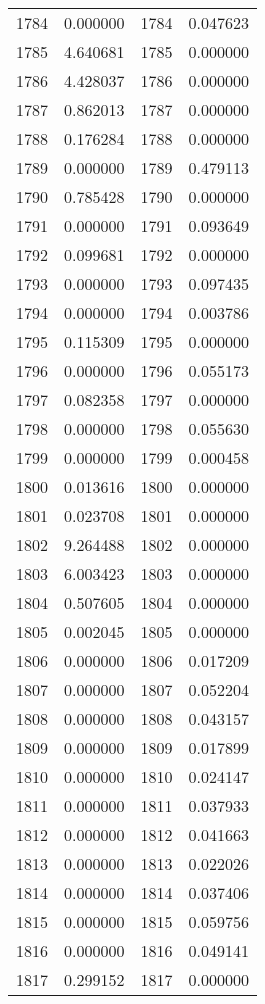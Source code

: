 \documentclass[12pt]{article}
\begin{document}
\begin{longtable}{@{}cccc@{}}
1784 & 0.000000 & 1784 & 0.047623 \\
1785 & 4.640681 & 1785 & 0.000000 \\
1786 & 4.428037 & 1786 & 0.000000 \\
1787 & 0.862013 & 1787 & 0.000000 \\
1788 & 0.176284 & 1788 & 0.000000 \\
1789 & 0.000000 & 1789 & 0.479113 \\
1790 & 0.785428 & 1790 & 0.000000 \\
1791 & 0.000000 & 1791 & 0.093649 \\
1792 & 0.099681 & 1792 & 0.000000 \\
1793 & 0.000000 & 1793 & 0.097435 \\
1794 & 0.000000 & 1794 & 0.003786 \\
1795 & 0.115309 & 1795 & 0.000000 \\
1796 & 0.000000 & 1796 & 0.055173 \\
1797 & 0.082358 & 1797 & 0.000000 \\
1798 & 0.000000 & 1798 & 0.055630 \\
1799 & 0.000000 & 1799 & 0.000458 \\
1800 & 0.013616 & 1800 & 0.000000 \\
1801 & 0.023708 & 1801 & 0.000000 \\
1802 & 9.264488 & 1802 & 0.000000 \\
1803 & 6.003423 & 1803 & 0.000000 \\
1804 & 0.507605 & 1804 & 0.000000 \\
1805 & 0.002045 & 1805 & 0.000000 \\
1806 & 0.000000 & 1806 & 0.017209 \\
1807 & 0.000000 & 1807 & 0.052204 \\
1808 & 0.000000 & 1808 & 0.043157 \\
1809 & 0.000000 & 1809 & 0.017899 \\
1810 & 0.000000 & 1810 & 0.024147 \\
1811 & 0.000000 & 1811 & 0.037933 \\
1812 & 0.000000 & 1812 & 0.041663 \\
1813 & 0.000000 & 1813 & 0.022026 \\
1814 & 0.000000 & 1814 & 0.037406 \\
1815 & 0.000000 & 1815 & 0.059756 \\
1816 & 0.000000 & 1816 & 0.049141 \\
1817 & 0.299152 & 1817 & 0.000000 \\

\end{longtable}
\end{document}
